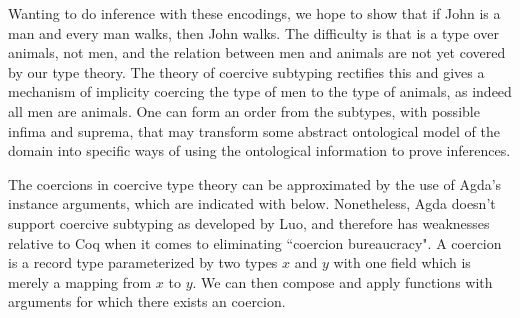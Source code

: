 Wanting to do inference with these encodings, we hope to show that if John is a
man and every man walks, then John walks. The difficulty is that  is
a type over animals, not men, and the relation between men and animals are not
yet covered by our type theory. The theory of coercive subtyping rectifies this
and gives a mechanism of implicity coercing the type of men to the type of
animals, as indeed all men are animals. One can form an order from the subtypes,
with possible infima and suprema, that may transform some abstract ontological
model of the domain into specific ways of using the ontological information to
prove inferences.

The coercions in coercive type theory can be approximated by the use of
Agda's instance arguments, which are indicated with \codeword{{{_}}} below.
Nonetheless, Agda doesn't support coercive subtyping as developed by Luo, and
therefore has weaknesses relative to Coq when it comes to eliminating ``coercion
bureaucracy". A coercion is a record type parameterized by two types $x$ and $y$
with one field  which is merely a mapping from $x$ to $y$. We can then
compose and apply functions with arguments for which there exists an coercion.


